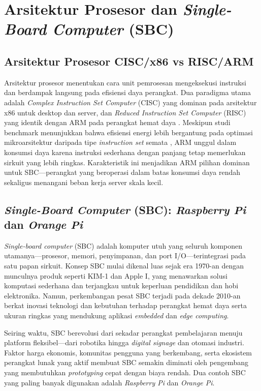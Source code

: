 \section{Arsitektur Prosesor dan \textit{Single-Board Computer} (SBC)}

\subsection{Arsitektur Prosesor CISC/x86 vs RISC/ARM}

Arsitektur prosesor menentukan cara unit pemrosesan mengeksekusi instruksi dan berdampak langsung pada efisiensi daya perangkat. Dua paradigma utama adalah \textit{Complex Instruction Set Computer} (CISC) yang dominan pada arsitektur x86 untuk desktop dan server, dan \textit{Reduced Instruction Set Computer} (RISC) yang identik dengan ARM pada perangkat hemat daya \cite{aroca2012towards}. Meskipun studi benchmark menunjukkan bahwa efisiensi energi lebih bergantung pada optimasi mikroarsitektur daripada tipe \textit{instruction set} semata \cite{blem2013power}, ARM unggul dalam konsumsi daya karena instruksi sederhana dengan panjang tetap memerlukan sirkuit yang lebih ringkas. Karakteristik ini menjadikan ARM pilihan dominan untuk SBC—perangkat yang beroperasi dalam batas konsumsi daya rendah sekaligus menangani beban kerja server skala kecil.



\subsection{\textit{Single-Board Computer} (SBC): \textit{Raspberry Pi} dan \textit{Orange Pi}}

\textit{Single-board computer} (SBC) adalah komputer utuh yang seluruh komponen utamanya—prosesor, memori, penyimpanan, dan port I/O—terintegrasi pada satu papan sirkuit. Konsep SBC mulai dikenal luas sejak era 1970-an dengan munculnya produk seperti KIM-1 dan Apple I, yang menawarkan solusi komputasi sederhana dan terjangkau untuk keperluan pendidikan dan hobi elektronika. Namun, perkembangan pesat SBC terjadi pada dekade 2010-an berkat inovasi teknologi dan kebutuhan terhadap perangkat hemat daya serta ukuran ringkas yang mendukung aplikasi \textit{embedded} dan \textit{edge computing}.

Seiring waktu, SBC berevolusi dari sekadar perangkat pembelajaran menuju platform fleksibel—dari robotika hingga \textit{digital signage} dan otomasi industri. Faktor harga ekonomis, komunitas pengguna yang berkembang, serta ekosistem perangkat lunak yang aktif membuat SBC semakin diminati oleh pengembang yang membutuhkan \textit{prototyping} cepat dengan biaya rendah. Dua contoh SBC yang paling banyak digunakan adalah \textit{Raspberry Pi} dan \textit{Orange Pi}.

